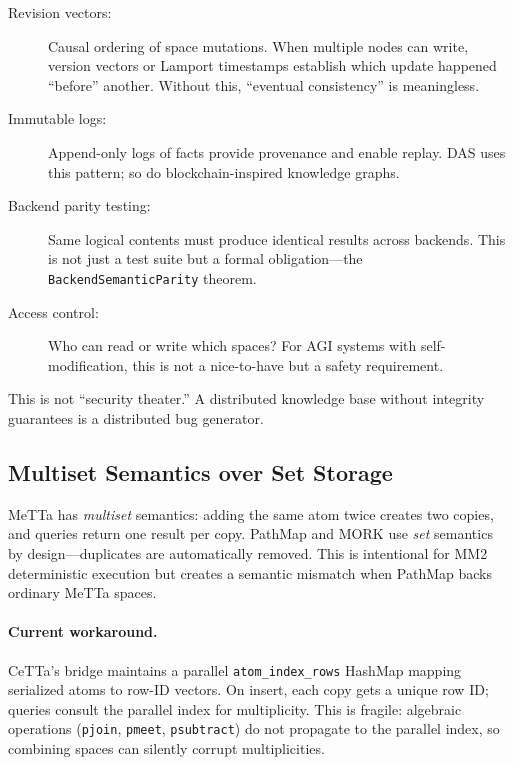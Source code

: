 \documentclass[11pt]{article}
\newcommand{\code}[1]{\texttt{#1}}
\newcommand{\CeTTa}{\textup{CeTTa}}
\newcommand{\PathMap}{\textup{PathMap}}
\newcommand{\MORK}{\textup{MORK}}
\newcommand{\MeTTa}{\textup{MeTTa}}
\begin{document}
\begin{description}
\item[Revision vectors:] Causal ordering of space mutations.  When multiple
  nodes can write, version vectors or Lamport timestamps establish which
  update happened ``before'' another.  Without this, ``eventual consistency''
  is meaningless.
\item[Immutable logs:] Append-only logs of facts provide provenance and
  enable replay.  DAS uses this pattern; so do blockchain-inspired
  knowledge graphs.
\item[Backend parity testing:] Same logical contents must produce identical
  results across backends.  This is not just a test suite but a formal
  obligation---the \code{BackendSemanticParity} theorem.
\item[Access control:] Who can read or write which spaces?  For AGI systems
  with self-modification, this is not a nice-to-have but a safety
  requirement.
\end{description}

This is not ``security theater.''  A distributed knowledge base without
integrity guarantees is a distributed bug generator.

\subsection{Multiset Semantics over Set Storage}
\label{sec:multiset-future}

\MeTTa{} has \emph{multiset} semantics: adding the same atom twice creates
two copies, and queries return one result per copy.  \PathMap{} and \MORK{}
use \emph{set} semantics by design---duplicates are automatically removed.
This is intentional for MM2 deterministic execution but creates a semantic
mismatch when \PathMap{} backs ordinary \MeTTa{} spaces.

\paragraph{Current workaround.}
\CeTTa{}'s bridge maintains a parallel \code{atom\_index\_rows} HashMap
mapping serialized atoms to row-ID vectors.  On insert, each copy gets a
unique row ID; queries consult the parallel index for multiplicity.
This is fragile: algebraic operations (\code{pjoin}, \code{pmeet},
\code{psubtract}) do not propagate to the parallel index, so combining
spaces can silently corrupt multiplicities.
\end{document}
